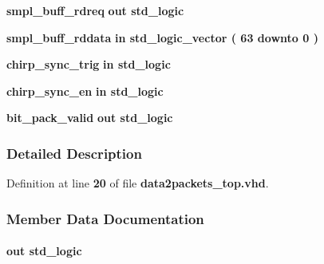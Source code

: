 \begin{DoxyCompactItemize}
\item 
{\bf smpl\+\_\+buff\+\_\+rdreq}  {\bfseries {\bfseries \textcolor{keywordflow}{out}\textcolor{vhdlchar}{ }}} {\bfseries \textcolor{comment}{std\+\_\+logic}\textcolor{vhdlchar}{ }} 
\item 
{\bf smpl\+\_\+buff\+\_\+rddata}  {\bfseries {\bfseries \textcolor{keywordflow}{in}\textcolor{vhdlchar}{ }}} {\bfseries \textcolor{comment}{std\+\_\+logic\+\_\+vector}\textcolor{vhdlchar}{ }\textcolor{vhdlchar}{(}\textcolor{vhdlchar}{ }\textcolor{vhdlchar}{ } \textcolor{vhdldigit}{63} \textcolor{vhdlchar}{ }\textcolor{keywordflow}{downto}\textcolor{vhdlchar}{ }\textcolor{vhdlchar}{ } \textcolor{vhdldigit}{0} \textcolor{vhdlchar}{ }\textcolor{vhdlchar}{)}\textcolor{vhdlchar}{ }} 
\item 
{\bf chirp\+\_\+sync\+\_\+trig}  {\bfseries {\bfseries \textcolor{keywordflow}{in}\textcolor{vhdlchar}{ }}} {\bfseries \textcolor{comment}{std\+\_\+logic}\textcolor{vhdlchar}{ }} 
\item 
{\bf chirp\+\_\+sync\+\_\+en}  {\bfseries {\bfseries \textcolor{keywordflow}{in}\textcolor{vhdlchar}{ }}} {\bfseries \textcolor{comment}{std\+\_\+logic}\textcolor{vhdlchar}{ }} 
\item 
{\bf bit\+\_\+pack\+\_\+valid}  {\bfseries {\bfseries \textcolor{keywordflow}{out}\textcolor{vhdlchar}{ }}} {\bfseries \textcolor{comment}{std\+\_\+logic}\textcolor{vhdlchar}{ }} 
\end{DoxyCompactItemize}


\subsubsection{Detailed Description}


Definition at line {\bf 20} of file {\bf data2packets\+\_\+top.\+vhd}.



\subsubsection{Member Data Documentation}
\paragraph[{bit\+\_\+pack\+\_\+valid}]{ {\bfseries \textcolor{keywordflow}{out}\textcolor{vhdlchar}{ }} {\bfseries \textcolor{comment}{std\+\_\+logic}\textcolor{vhdlchar}{ }} \hspace{0.3cm}{\ttfamily [Port]}}\label{classdata2packets__top_ab026d289e1122d09e7b20be7586420ac}


